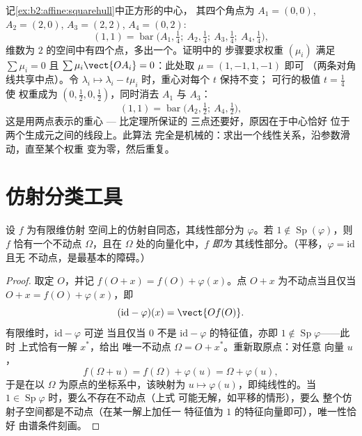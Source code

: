\begin{example}\label{ex:b2:affine:caratheodoryrun}
记\cref{ex:b2:affine:squarehull}中正方形的中心，
其四个角点为 $A_1 =
(0,0)$, $A_2 = (2,0)$, $A_3 = (2,2)$, $A_4 = (0,2)$:
\[
(1,1) = \operatorname{bar}\bigl(A_1, \tfrac14;\ A_2,
\tfrac14;\ A_3, \tfrac14;\ A_4, \tfrac14\bigr),
\]
维数为 $2$ 的空间中有四个点，多出一个。证明中的
步骤要求权重 $(\mu_i)$ 满足 $\sum\mu_i = 0$ 且
$\sum\mu_i\vect{OA_i} = 0$：此处取 $\mu = (1, -1, 1, -1)$ 即可
（两条对角线共享中点）。令 $\lambda_i
\mapsto \lambda_i - t\mu_i$ 时，重心对每个 $t$ 保持不变；
可行的极值 $t = \frac14$ 使
权重成为 $(0, \tfrac12, 0, \tfrac12)$，同时消去 $A_1$ 与
$A_3$：
\[
(1,1) = \operatorname{bar}\bigl(A_2, \tfrac12;\ A_4,
\tfrac12\bigr),
\]
这是用两点表示的重心 --- 比定理所保证的
三点还要好，原因在于中心恰好
位于两个生成元之间的线段上。此算法
完全是机械的：求出一个线性关系，沿参数滑动，直至某个权重
变为零，然后重复。
\end{example}

\section{仿射分类工具}

\begin{proposition}[仿射映射的不动点]\label{prop:b2:affine:fixedpoint}
设 $f$ 为有限维仿射
空间上的仿射自同态，其线性部分为 $\varphi$。若 $1 \notin
\operatorname{Sp}(\varphi)$，则 $f$ 恰有一个不动点
$\Omega$，且在 $\Omega$ 处的向量化中，$f$ \emph{即为}
其线性部分。（平移，$\varphi = \mathrm{id}$ 且无
不动点，是最基本的障碍。）
\end{proposition}

\begin{proof}
取定 $O$，并记 $f(O + x) = f(O) + \varphi(x)$。点
$O + x$ 为不动点当且仅当 $O + x = f(O) + \varphi(x)$，即
\[
(\mathrm{id} - \varphi)(x) = \vect{O f(O)} .
\]
有限维时，$\mathrm{id} - \varphi$ 可逆
当且仅当 $0$ 不是 $\mathrm{id} - \varphi$ 的特征值，亦即
$1 \notin \operatorname{Sp}\varphi$——此时
上式恰有一解 $x^*$，给出
唯一不动点 $\Omega = O + x^*$。重新取原点：对任意
向量 $u$，
\[
f(\Omega + u) = f(\Omega) + \varphi(u) = \Omega + \varphi(u),
\]
于是在以 $\Omega$ 为原点的坐标系中，该映射为 $u \mapsto
\varphi(u)$，即纯线性的。当 $1 \in
\operatorname{Sp}\varphi$ 时，要么不存在不动点（上式
可能无解，如平移的情形），要么
整个仿射子空间都是不动点（在某一解上加任一
特征值为 $1$ 的特征向量即可），唯一性恰好
由谱条件刻画。
\end{proof}

